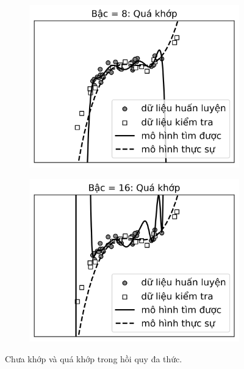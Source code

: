 \begin{figure}[t]
    \begin{subfigure}{0.49\textwidth}
    \includegraphics[width=0.99\linewidth]{ebookML_src/src/overfitting/poly8.png}
    \caption{} 
    \label{fig:15_polyregc}
    \end{subfigure}
    \begin{subfigure}{0.49\textwidth}
    \includegraphics[width=0.99\linewidth]{ebookML_src/src/overfitting/poly16.png}
    \caption{}
    \label{fig:15_polyregd}
    \end{subfigure}
    \caption{
      Chưa khớp và quá khớp trong hồi quy đa thức. 
    }
    \label{fig:15_polyreg}
\end{figure}
 
